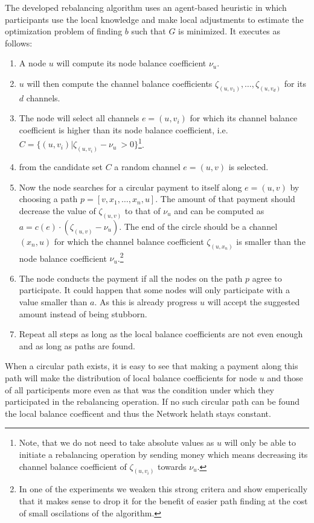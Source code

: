 \documentclass[a4paper]{paper}
\begin{document}
The developed rebalancing algorithm uses an agent-based heuristic in which participants use the local knowledge and make local adjustments to estimate the optimization problem of finding $b$ such that $G$ is minimized.
It executes as follows:
\begin{enumerate}
\item A node $u$ will compute its node balance coefficient $\nu_u$.
\item $u$ will then compute the channel balance coefficients $\zeta_{(u,v_1)},\dots,\zeta_{(u,v_d)}$ for its $d$ channels.
\item The node will select all channels $e=(u,v_i)$ for which its channel balance coefficient is higher 
than its node balance coefficient, i.e.~$C = \{(u,v_i) | \zeta_{(u,v_i)} - \nu_u\ > 0\}$\footnote{
  Note, that we do not need to take absolute values as $u$ will only be able to initiate a rebalancing operation by sending money which means decreasing its channel balance coefficient of $\zeta_{(u,v_i)}$ towards $\nu_u$.}.
\item from the candidate set $C$ a random channel $e=(u,v)$ is selected.
\item Now the node searches for a circular payment to itself along $e=(u,v)$ by choosing a path $p = [v,x_1,\dots,x_n,u]$. The amount of that payment should decrease the value of $\zeta_{(u,v)}$ to that of $\nu_u$ and can be computed as $a = c(e)\cdot (\zeta_{(u,v)}-\nu_u)$. The end of the circle should be a channel $(x_n,u)$ for which the channel balance coefficient $\zeta_{(u,x_n)}$ is smaller than the node balance coefficient $\nu_u$.\footnote{In one of the experiments we weaken this strong critera and show emperically that it makes sense to drop it for the benefit of easier path finding at the cost of small oscilations of the algorithm.}
\item The node conducts the payment if all the nodes on the path $p$ agree to participate. It could happen that some nodes will only participate with a value smaller than $a$. As this is already progress $u$ will accept the suggested amount instead of being stubborn. 
\item Repeat all steps as long as the local balance coefficients are not even enough and as long as paths are found.
\end{enumerate}

When a circular path exists, it is easy to see that making a payment along this path will make the distribution of local balance coefficients for node $u$ and those of all participents more even as that was the condition under which they participated in the rebalancing operation.
If no such circular path can be found the local balance coefficent and thus the Network helath stays constant.
\end{document}
